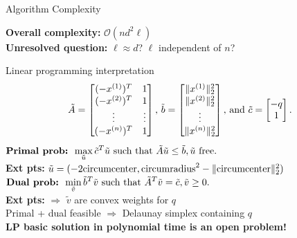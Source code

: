 \documentclass[aspectratio=169]{beamer}
\begin{document}
\begin{frame}{Algorithm Complexity}
\medskip
\pause
{\bf Overall complexity:} $\mathcal{O}(nd^2 \ell)$\\
\medskip
\pause
{\bf Unresolved question:} $\ell \approx d$? $\ell$ independent of $n$?
\end{frame}

\begin{frame}{Linear programming interpretation}
$$
{\tilde A} = \left[ \begin{matrix}
(-x^{(1)})^T & 1 \cr
(-x^{(2)})^T & 1 \cr
\vdots & \vdots \cr
(-x^{(n)})^T & 1 \cr
\end{matrix}\right]\text{, }
{\tilde b} = \left[ \begin{matrix}
\| x^{(1)} \|_2^2 \cr
\| x^{(2)} \|_2^2 \cr
\vdots \cr
\| x^{(n)} \|_2^2 \cr
\end{matrix}\right]\text{, and }
{\tilde c} = \left[ \begin{matrix}
-q \cr
1 \cr
\end{matrix}\right].
$$
\pause
$\displaystyle \hbox{\bf Primal prob: }
\max_{\tilde u} {\tilde c}^T {\tilde u}
\hbox{ such that }
{\tilde A}{\tilde u} \leq {\tilde b}, {\tilde u}\hbox{ free}.$\\
{\bf Ext pts:}
${\tilde u} = (-2\hbox{circumcenter}, \hbox{circumradius}^2 - \|\hbox{circumcenter}\|_2^2)$\\
\medskip
\pause
$\displaystyle \hbox{\bf Dual prob: }
\min_{\tilde v} {\tilde b}^T {\tilde v}
\hbox{ such that }
{\tilde A}^T{\tilde v} = {\tilde c}, {\tilde v}\geq 0.$\\
{\bf Ext pts:}
$\Rightarrow$ ${\tilde v}$ are convex weights for $q$\\
\medskip
\pause
Primal + dual feasible $\Rightarrow$ Delaunay simplex containing $q$\\
\medskip
\pause
{\bf LP basic solution in polynomial time is an open problem!}
\end{frame}
\end{document}

